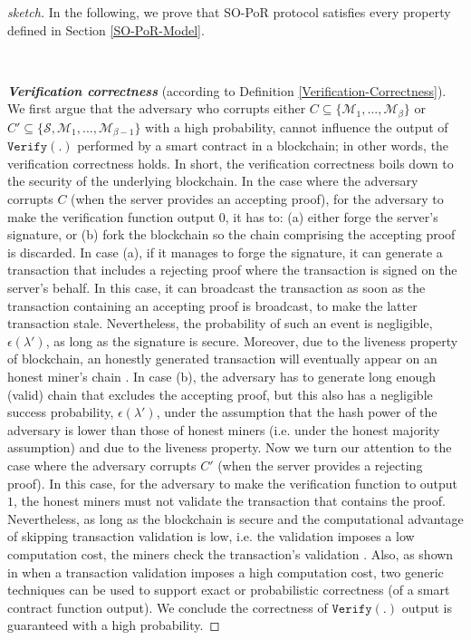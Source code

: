 \begin{proof}[sketch]  In the following, we prove that SO-PoR protocol satisfies every  property defined in Section \ref{SO-PoR-Model}.   

\

\noindent\textbf{\textit{Verification correctness}} (according to Definition \ref{Verification-Correctness}). We first argue that the adversary who corrupts either $C\subseteq\{\mathcal{M}_{\scriptscriptstyle 1},...,\mathcal{M}_{\scriptscriptstyle\beta}\}$ or $C'\subseteq\{\mathcal{S},\mathcal{M}_{\scriptscriptstyle 1},...,\mathcal{M}_{\scriptscriptstyle\beta-1}\}$ with a high probability, cannot influence the output of $\mathtt{Verify}(.)$ performed by a smart contract in a blockchain; in other words, the verification correctness holds. In short, the verification correctness boils down to the security of the underlying blockchain. In the case where the adversary corrupts $C$ (when the server provides an accepting proof),  for the adversary to make the verification function output $0$, it has to: (a) either forge the server's signature, or (b)  fork the blockchain so the chain  comprising the accepting proof is discarded. In case (a),  if it manages to forge the signature, it can generate a transaction that includes   a rejecting proof where the transaction is signed on the server's behalf. In this case, it  can broadcast the transaction as soon as the transaction containing an accepting proof is broadcast,  to make the latter transaction stale. Nevertheless, the probability of such  an event is negligible, $\epsilon(\lambda')$, as long as the signature is secure. Moreover, due to the liveness property of blockchain, an honestly generated transaction will eventually appear on an honest miner's chain \cite{DBLP:conf/crypto/GarayKL17}. In case (b),  the adversary has to generate long enough (valid) chain that excludes the accepting proof, but this also has a negligible success probability, $\epsilon(\lambda')$, under the assumption that the hash power of the adversary is lower than those of  honest miners (i.e. under the honest majority assumption) and due to the liveness property. Now we turn our attention to the case where the adversary corrupts $C'$ (when the server provides a rejecting proof). In this case, for the adversary to make the verification function to output $1$, the honest miners must not validate the transaction that contains the proof. Nevertheless, as long as the blockchain is secure and  the computational advantage of skipping transaction validation is low, i.e. the validation imposes a low computation cost, the miners check   the transaction's validation \cite{LuuTKS15}. Also, as shown in \cite{LuuTKS15} when a transaction validation imposes a high computation cost, two generic techniques can be used to support exact or probabilistic correctness (of a smart contract function output). We conclude the correctness of $\mathtt{Verify}(.)$ output  is guaranteed with a high probability.


\end{proof}
